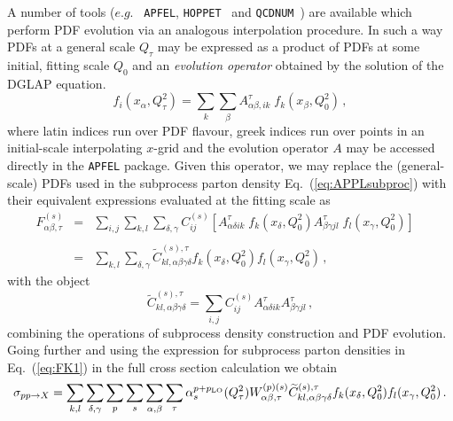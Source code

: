 \documentclass[preprint,12pt]{elsarticle}
\begin{document}
A number of tools ($e.g.$ {\tt
  APFEL},
{\tt HOPPET}~\cite{Salam:2008qg} and {\tt QCDNUM}~\cite{Botje:2010ay}) 
are available which perform PDF evolution via an analogous
interpolation procedure. In such a way PDFs at a general scale $Q_\tau$ may be
expressed as a product of PDFs at some initial, fitting scale $Q_0$ and an
\textit{evolution operator} obtained by the solution of the DGLAP equation.
\begin{equation}\label{eq:fastPDFfinal_recalled}
  f_i(x_{\alpha},Q^2_\tau) = \sum_{k}
  \sum_\beta A^\tau_{\alpha\beta, ik}\;
  f_k(x_\beta,Q^2_0)\,, 
\end{equation}
where latin indices run over PDF flavour, greek indices run over points in an initial-scale interpolating $x$-grid and
the evolution operator $A$ may be accessed directly in the {\tt APFEL} package. Given this operator, we may replace the
(general-scale) PDFs used in the subprocess parton density
Eq.~(\ref{eq:APPLsubproc}) with their equivalent expressions evaluated at the fitting scale as
\begin{equation}\label{eq:FK1}
\begin{array}{rcl}
F^{(s)}_{\alpha\beta,\tau} &=&  \displaystyle \sum_{i,j} \sum_{k,l}
                               \sum_{\delta,\gamma} C^{(s)}_{ij}
                               \left[  A^\tau_{\alpha\delta ik}\;
                               f_k(x_\delta,Q^2_0) A^\tau_{\beta\gamma
                               jl}\; f_l(x_\gamma,Q^2_0) \right]\;\;\;
  \\
\\
&=& \displaystyle \sum_{k,l}\sum_{\delta,\gamma}
\widetilde{C}^{(s),\tau}_{kl,\alpha\beta\gamma\delta}
f_k(x_\delta,Q^2_0) f_l(x_\gamma,Q^2_0)\,,
\end{array}
\end{equation}
with the object
\begin{equation}
  \widetilde{C}^{(s),\tau}_{kl,\alpha\beta\gamma\delta} =
  \sum_{i,j} C^{(s)}_{ij} A^\tau_{\alpha\delta ik}
  A^\tau_{\beta\gamma jl}\,,
\end{equation}
combining the operations of subprocess density construction and PDF
evolution. Going further and using the expression for
subprocess parton densities in Eq.~(\ref{eq:FK1}) in the full
cross section calculation we obtain
\begin{equation}
\sigma_{pp\to X} = \sum_{k,l}\sum_{\delta,\gamma}\sum_p
\sum_{s} \sum_{\alpha,\beta}
\sum_{\tau} 
\alpha_s^{p+p_{\rm LO}}(Q^2_\tau)W_{\alpha\beta,\tau}^{(p)(s)} \widetilde{C}^{(s),\tau}_{kl,\alpha\beta\gamma\delta}
f_k(x_\delta,Q^2_0) f_l(x_\gamma,Q^2_0)\,.
\end{equation}
\end{document}

